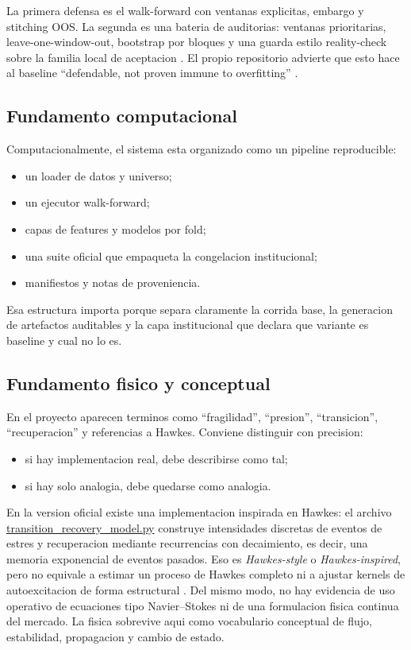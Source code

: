 \documentclass[11pt,letterpaper]{article}
\newcommand{\code}[1]{{\urlstyle{tt}\url{#1}}}
\begin{document}
La primera defensa es el walk-forward con ventanas explicitas, embargo y stitching OOS. La segunda es una bateria de auditorias: ventanas prioritarias, leave-one-window-out, bootstrap por bloques y una guarda estilo reality-check sobre la familia local de aceptacion \citep{white2000,quantOfficialAudits2026}. El propio repositorio advierte que esto hace al baseline \enquote{defendable, not proven immune to overfitting} \citep{quantBaselineDocs2026}.

\subsection{Fundamento computacional}
Computacionalmente, el sistema esta organizado como un pipeline reproducible:

\begin{itemize}
    \item un loader de datos y universo;
    \item un ejecutor walk-forward;
    \item capas de features y modelos por fold;
    \item una suite oficial que empaqueta la congelacion institucional;
    \item manifiestos y notas de proveniencia.
\end{itemize}

Esa estructura importa porque separa claramente la corrida base, la generacion de artefactos auditables y la capa institucional que declara que variante es baseline y cual no lo es.

\subsection{Fundamento fisico y conceptual}
En el proyecto aparecen terminos como \enquote{fragilidad}, \enquote{presion}, \enquote{transicion}, \enquote{recuperacion} y referencias a Hawkes. Conviene distinguir con precision:

\begin{itemize}
    \item si hay implementacion real, debe describirse como tal;
    \item si hay solo analogia, debe quedarse como analogia.
\end{itemize}

En la version oficial existe una implementacion inspirada en Hawkes: el archivo \code{transition_recovery_model.py} construye intensidades discretas de eventos de estres y recuperacion mediante recurrencias con decaimiento, es decir, una memoria exponencial de eventos pasados. Eso es \emph{Hawkes-style} o \emph{Hawkes-inspired}, pero no equivale a estimar un proceso de Hawkes completo ni a ajustar kernels de autoexcitacion de forma estructural \citep{hawkes1971}. Del mismo modo, no hay evidencia de uso operativo de ecuaciones tipo Navier--Stokes ni de una formulacion fisica continua del mercado. La fisica sobrevive aqui como vocabulario conceptual de flujo, estabilidad, propagacion y cambio de estado.
\end{document}
